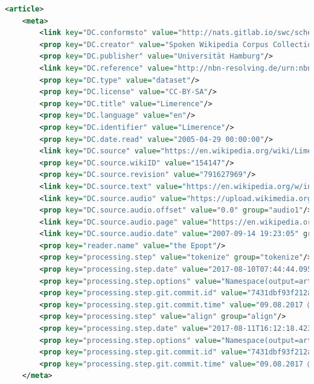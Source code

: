 \documentclass[12pt,a4paper,titlepage]{article}
\begin{document}
\label{subsec:annotazioni}
\begin{lstlisting}[language=XML,firstnumber=1, caption=Metadati delle annotazioni delle parole in un audio, label=metadati_annotazioni,captionpos=b]
<article>
	<meta>
		<link key="DC.conformsto" value="http://nats.gitlab.io/swc/schema/swc-1.0.rnc"/>
		<prop key="DC.creator" value="Spoken Wikipedia Corpus Collection Software"/>
		<prop key="DC.publisher" value="Universität Hamburg"/>
		<link key="DC.reference" value="http://nbn-resolving.de/urn:nbn:de:gbv:18-228-7-2209"/>
		<prop key="DC.type" value="dataset"/>
		<prop key="DC.license" value="CC-BY-SA"/>
		<prop key="DC.title" value="Limerence"/>
		<prop key="DC.language" value="en"/>
		<prop key="DC.identifier" value="Limerence"/>
		<prop key="DC.date.read" value="2005-04-29 00:00:00"/>
		<link key="DC.source" value="https://en.wikipedia.org/wiki/Limerence"/>
		<prop key="DC.source.wikiID" value="154147"/>
		<prop key="DC.source.revision" value="791627969"/>
		<link key="DC.source.text" value="https://en.wikipedia.org/w/index.php?title=Limerence&oldid=13811989"/>
		<link key="DC.source.audio" value="https://upload.wikimedia.org/wikipedia/commons/a/aa/Limerence.ogg" group="audio1"/>
		<prop key="DC.source.audio.offset" value="0.0" group="audio1"/>
		<link key="DC.source.audio.page" value="https://en.wikipedia.org/w/index.php?title=File%3aLimerence.ogg" group="audio1"/>
		<link key="DC.source.audio.date" value="2007-09-14 19:23:05" group="audio1"/>
		<prop key="reader.name" value="the Epopt"/>
		<prop key="processing.step" value="tokenize" group="tokenize"/>
		<prop key="processing.step.date" value="2017-08-10T07:44:44.095+02:00[Europe/Berlin]" group="tokenize"/>
		<prop key="processing.step.options" value="Namespace(output=articles/Limerence/tokenized.swc, all_sections=false, null_normalize=false, raw_output=null, subparser_name=tokenize, lang=en, no_introduction=false, article_dir=articles/Limerence)" group="tokenize"/>
		<prop key="processing.step.git.commit.id" value="7431dbf93f212ad828208abaf8f518fb8de11ff3" group="tokenize"/>
		<prop key="processing.step.git.commit.time" value="09.08.2017 @ 15:21:55 CEST" group="tokenize"/>
		<prop key="processing.step" value="align" group="align"/>
		<prop key="processing.step.date" value="2017-08-11T16:12:18.423+02:00[Europe/Berlin]" group="align"/>
		<prop key="processing.step.options" value="Namespace(output=articles/Limerence/aligned.swc, transcript=articles/Limerence/tokenized.swc, g2p=../model_en/model.fst.ser, phone=false, subparser_name=align, dict=../model_en/empty.dic, acoustic_model=../model_en/, audio=articles/Limerence/audio.wav)" group="align"/>
		<prop key="processing.step.git.commit.id" value="7431dbf93f212ad828208abaf8f518fb8de11ff3" group="align"/>
		<prop key="processing.step.git.commit.time" value="09.08.2017 @ 15:21:55 CEST" group="align"/>
	</meta>
\end{lstlisting}
\end{document}
